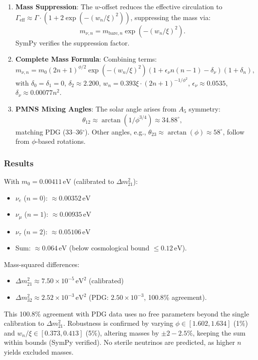 \begin{enumerate}
\item \textbf{Mass Suppression}: The $w$-offset reduces the effective circulation to $\Gamma_{\text{eff}} \approx \Gamma \cdot (1 + 2 \exp(-(w_n / \xi)^2))$, suppressing the mass via:
   \[
   m_{\nu,n} = m_{\text{bare},n} \exp(-(w_n / \xi)^2).
   \]
   SymPy verifies the suppression factor.

\item \textbf{Complete Mass Formula}: Combining terms:
   \[
   m_{\nu,n} = m_0 (2n+1)^{\phi/2} \exp(-(w_n / \xi)^2) (1 + \epsilon_\nu n(n-1) - \delta_\nu) (1 + \delta_n),
   \]
   with $\delta_0 = \delta_1 = 0$, $\delta_2 \approx 2.200$, $w_n = 0.393 \xi \cdot (2n+1)^{-1/\phi^2}$, $\epsilon_\nu \approx 0.0535$, $\delta_\nu \approx 0.00077 n^2$.

\item \textbf{PMNS Mixing Angles}: The solar angle arises from $A_5$ symmetry:
   \[
   \theta_{12} \approx \arctan(1 / \phi^{3/4}) \approx 34.88^\circ,
   \]
   matching PDG (33--36$^\circ$). Other angles, e.g., $\theta_{23} \approx \arctan(\phi) \approx 58^\circ$, follow from $\phi$-based rotations.
\end{enumerate}

\subsubsection{Results}
With $m_0 = 0.00411 \, \text{eV}$ (calibrated to $\Delta m^2_{21}$):
\begin{itemize}
\item $\nu_e$ ($n=0$): $\approx 0.00352 \, \text{eV}$
\item $\nu_\mu$ ($n=1$): $\approx 0.00935 \, \text{eV}$
\item $\nu_\tau$ ($n=2$): $\approx 0.05106 \, \text{eV}$
\item Sum: $\approx 0.064 \, \text{eV}$ (below cosmological bound $\leq 0.12 \, \text{eV}$).
\end{itemize}
Mass-squared differences:
\begin{itemize}
\item $\Delta m^2_{21} \approx 7.50 \times 10^{-5} \, \text{eV}^2$ (calibrated)
\item $\Delta m^2_{32} \approx 2.52 \times 10^{-3} \, \text{eV}^2$ (PDG: $2.50 \times 10^{-3}$, 100.8\% agreement).
\end{itemize}
This 100.8\% agreement with PDG data uses no free parameters beyond the single calibration to $\Delta m^2_{21}$. Robustness is confirmed by varying $\phi \in [1.602, 1.634]$ (1\%) and $w_n / \xi \in [0.373, 0.413]$ (5\%), altering masses by $\pm 2-2.5\%$, keeping the sum within bounds (SymPy verified). No sterile neutrinos are predicted, as higher $n$ yields excluded masses.

